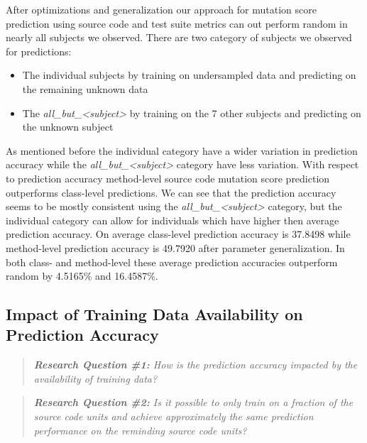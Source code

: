After optimizations and generalization our approach for mutation score prediction using source code and test suite metrics can out perform random in nearly all subjects we observed. There are two category of subjects we observed for predictions:

\begin{itemize}
  \item The individual subjects by training on undersampled data and predicting on the remaining unknown data
  \item The \emph{all\_but\_<subject>} by training on the 7 other subjects and predicting on the unknown subject
\end{itemize}

As mentioned before the individual category have a wider variation in prediction accuracy while the \emph{all\_but\_<subject>} category have less variation. With respect to prediction accuracy method-level source code mutation score prediction outperforms class-level predictions. We can see that the prediction accuracy seems to be mostly consistent using the \emph{all\_but\_<subject>} category, but the individual category can allow for individuals which have higher then average prediction accuracy. On average class-level prediction accuracy is 37.8498 while method-level prediction accuracy is 49.7920 after parameter generalization. In both class- and method-level these average prediction accuracies outperform random by 4.5165\% and 16.4587\%.


\subsection{Impact of Training Data Availability on Prediction Accuracy}
\label{subsec:experiment_data}
\begin{quote}
	\emph{\textbf{Research Question \#1:} How is the prediction accuracy impacted by the availability of training data?}
\end{quote}

\begin{quote}
  \emph{\textbf{Research Question \#2:} Is it possible to only train on a fraction of the source code units and achieve approximately the same prediction performance on the reminding source code units?}
\end{quote}

